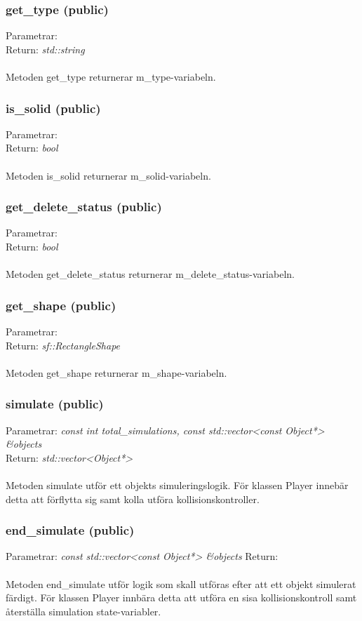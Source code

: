 \documentclass{TDP003mall}
\begin{document}
 \subsubsection{get\_type (public)}
Parametrar: \textit{}
\\Return: \textit{std::string}
\\\\
Metoden get\_type returnerar m\_type-variabeln.

 \subsubsection{is\_solid (public)}
Parametrar: \textit{}
\\Return: \textit{bool}
\\\\
Metoden is\_solid returnerar m\_solid-variabeln.

 \subsubsection{get\_delete\_status (public)}
Parametrar: \textit{}
\\Return: \textit{bool}
\\\\
Metoden get\_delete\_status returnerar m\_delete\_status-variabeln.

 \subsubsection{get\_shape (public)}
Parametrar: \textit{}
\\Return: \textit{sf::RectangleShape}
\\\\
Metoden get\_shape returnerar m\_shape-variabeln.

 \subsubsection{simulate (public)}
Parametrar: \textit{const int total\_simulations, const std::vector<const Object*> \&objects}
\\Return: \textit{std::vector<Object*>}
\\\\
Metoden simulate utför ett objekts simuleringslogik. För klassen Player innebär detta att förflytta sig samt kolla utföra kollisionskontroller.

\subsubsection{end\_simulate (public)}
Parametrar: \textit{const std::vector<const Object*> \&objects}
Return:
\\\\
Metoden end\_simulate utför logik som skall utföras efter att ett objekt simulerat färdigt. För klassen Player innbära detta att utföra en sisa kollisionskontroll samt återställa simulation state-variabler.
\end{document}
